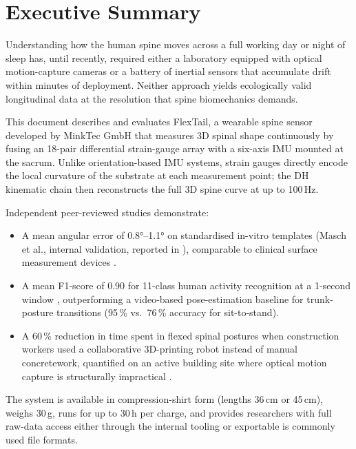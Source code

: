 \section*{Executive Summary}

Understanding how the human spine moves across a full working day or night of sleep
has, until recently, required either a laboratory equipped with optical motion-capture
cameras or a battery of inertial sensors that accumulate drift within minutes of
deployment.
Neither approach yields ecologically valid longitudinal data at the resolution that
spine biomechanics demands.

This document describes and evaluates FlexTail, a wearable spine sensor developed by
MinkTec GmbH \cite{minktec2025} that measures 3D spinal shape continuously by fusing an 18-pair
differential strain-gauge array with a six-axis \ac{IMU} mounted
at the sacrum.
Unlike orientation-based IMU systems, strain gauges directly encode the local curvature
of the substrate at each measurement point; the \ac{DH} kinematic chain then
reconstructs the full 3D spine curve at up to 100\,Hz.

Independent peer-reviewed studies demonstrate:

\begin{itemize}
	\item A mean angular error of \ang{0.8}--\ang{1.1} on standardised in-vitro templates
	      (Masch et al., internal validation, reported in \cite{walkling2025}), comparable
	      to clinical surface measurement devices \cite{spinalMouse}.
	\item A mean F1-score of 0.90 for 11-class human activity recognition at a 1-second
	      window \cite{walkling2025}, outperforming a video-based pose-estimation baseline
	      for trunk-posture transitions (95\,\% vs.\ 76\,\% accuracy for sit-to-stand).
	\item A 60\,\% reduction in time spent in flexed spinal postures when construction
	      workers used a collaborative 3D-printing robot instead of manual concretework,
	      quantified on an active building site where optical motion capture is
	      structurally impractical \cite{sawicki2026}.
\end{itemize}

The system is available in compression-shirt form (lengths 36\,cm or 45\,cm), weighs
30\,g, runs for up to 30\,h per charge, and provides researchers with full raw-data
access either through the internal tooling or exportable is commonly used file formats.

\newpage
